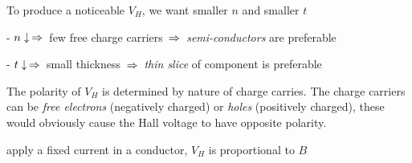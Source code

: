 To produce a noticeable $V_H$, we want smaller $n$ and smaller $t$

\begin{compactenum}
	\item[-] $n\downarrow \, \Rightarrow \,$ few free charge carriers $\, \Rightarrow \,$ \emph{semi-conductors} are preferable

	\item[-] $t\downarrow \, \Rightarrow \,$ small thickness $\, \Rightarrow \,$ \emph{thin slice} of component is preferable

\end{compactenum}

The polarity of $V_H$ is determined by nature of charge carries. The charge carriers can be \emph{free electrons} (negatively charged) or \emph{holes} (positively charged), these would obviously cause the Hall voltage to have opposite polarity.


	
\cmt apply a fixed current in a conductor, $V_H$ is proportional to $B$
	
	



	
